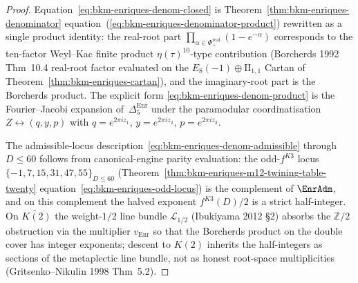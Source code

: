 \begin{proof}[Proof]
Equation~\eqref{eq:bkm-enriques-denom-closed} is
Theorem~\ref{thm:bkm-enriques-denominator} equation~(\ref{eq:bkm-enriques-denominator-product})
rewritten as a single product identity: the real-root part
$\prod_{\alpha\in\Phi_+^{\mathrm{real}}}(1 - e^{-\alpha})$ corresponds
to the ten-factor Weyl--Kac finite product
$\eta(\tau)^{10}$-type contribution (Borcherds 1992 Thm~10.4 real-root
factor evaluated on the $E_8(-1)\oplus\mathrm{II}_{1,1}$ Cartan of
Theorem~\ref{thm:bkm-enriques-cartan}), and the imaginary-root part
is the Borcherds product. The explicit form
\eqref{eq:bkm-enriques-denom-product} is the Fourier--Jacobi
expansion of~$\Delta_5^{\mathrm{Enr}}$ under the paramodular
coordinatisation $Z\leftrightarrow(q,y,p)$ with
$q = e^{2\pi i z_1}$, $y = e^{2\pi i z_2}$, $p = e^{2\pi i z_3}$.

The admissible-locus description~\eqref{eq:bkm-enriques-denom-admissible}
through $D\leq 60$ follows from canonical-engine
parity evaluation: the odd-$f^{K3}$ locus
$\{-1, 7, 15, 31, 47, 55\}_{D\leq 60}$
(Theorem~\ref{thm:bkm-enriques-m12-twining-table-twenty}
equation~\eqref{eq:bkm-enriques-odd-locus}) is the complement of
$\EnrAdm$, and on this complement the halved exponent
$f^{K3}(D)/2$ is a strict half-integer. On $\widetilde{K(2)}$ the
weight-$1/2$ line bundle $\mathcal{L}_{1/2}$ (Ibukiyama 2012 \S 2)
absorbs the $\mathbb{Z}/2$ obstruction via the multiplier $v_{\mathrm{Enr}}$
so that the Borcherds product on the double cover has integer
exponents; descent to $K(2)$ inherits the half-integers as sections
of the metaplectic line bundle, not as honest root-space
multiplicities (Gritsenko--Nikulin 1998 Thm~5.2).


\end{proof}
